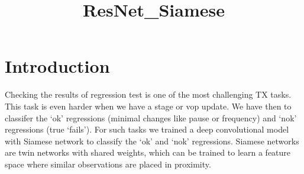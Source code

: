\documentclass[11pt]{article}
\title{ResNet\_Siamese}
\begin{document}
    
    
    \maketitle
    
    

    
    \hypertarget{introduction}{%
\section{Introduction}\label{introduction}}

Checking the results of regression test is one of the most challenging
TX tasks. This task is even harder when we have a stage or vop update.
We have then to classifer the `ok' regressions (minimal changes like
pause or frequency) and `nok' regressions (true `fails'). For such tasks
we trained a deep convolutional model with Siamese network to classify
the `ok' and `nok' regressions. Siamese networks are twin networks with
shared weights, which can be trained to learn a feature space where
similar observations are placed in proximity.
\end{document}
